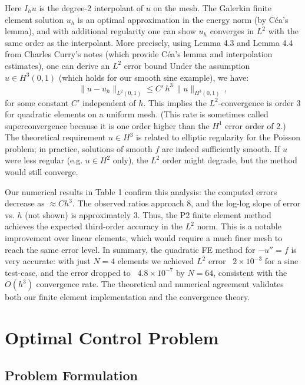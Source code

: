 \documentclass[a4paper,10pt]{article}
\begin{document}

Here $I_h u$ is the degree-2 interpolant of $u$ on the mesh. The Galerkin finite element solution $u_h$ is an optimal approximation in the energy norm (by Céa's lemma), and with additional regularity one can show $u_h$ converges in $L^2$ with the same order as the interpolant.
More precisely, using Lemma 4.3 and Lemma 4.4 from Charles Curry's notes (which provide Céa's lemma and interpolation estimates), one can derive an $L^2$ error bound
Under the assumption $u \in H^3(0,1)$ (which holds for our smooth sine example), we have:
$$
	\|u - u_h\|_{L^2(0,1)} \le C'\,h^3\,\|u\|_{H^3(0,1)}\,,
$$
for some constant $C'$ independent of $h$. This implies the $L^2$-convergence is order 3 for quadratic elements on a uniform mesh.
(This rate is sometimes called superconvergence because it is one order higher than the $H^1$ error order of 2.)
The theoretical requirement $u\in H^3$ is related to elliptic regularity for the Poisson problem; in practice, solutions of smooth $f$ are indeed sufficiently smooth.
If $u$ were less regular (e.g. $u\in H^2$ only), the $L^2$ order might degrade, but the method would still converge.

Our numerical results in Table 1 confirm this analysis: the computed errors decrease as $\approx C h^3$. The observed ratios approach 8, and the log-log slope of error vs. $h$ (not shown) is approximately 3. Thus, the P2 finite element method achieves the expected third-order accuracy in the $L^2$ norm. This is a notable improvement over linear elements, which would require a much finer mesh to reach the same error level. In summary, the quadratic FE method for $-u''=f$ is very accurate: with just $N=4$ elements we achieved $L^2$ error ~$2\times10^{-3}$ for a sine test-case, and the error dropped to ~$4.8\times10^{-7}$ by $N=64$, consistent with the $O(h^3)$ convergence rate. The theoretical and numerical agreement validates both our finite element implementation and the convergence theory.

\section{Optimal Control Problem}
\subsection{Problem Formulation}
\end{document}
